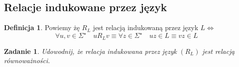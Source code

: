 \documentclass[12pt,a4paper]{article}
\newtheorem{zad}{Zadanie}
\theoremstyle{definition}
\newtheorem{df}{Definicja}
\begin{document}
\subsection{Relacje indukowane przez język}	
	
	\begin{df}
		Powiemy żę $R_L$ jest relacją indukowaną przez język 
		$L \Leftrightarrow$ $$ \forall u,v \in \Sigma^\star \quad uR_Lv \equiv \forall z\in \Sigma^\star \quad uz\in L \equiv vz\in L$$
	\end{df}	
	
	\begin{zad} 
		Udowodnij, że relacja indukowana przez język $(R_L)$ jest relacją równoważności.
	\end{zad}
	
\end{document}
